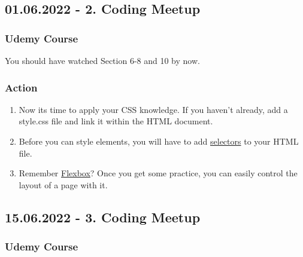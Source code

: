 \documentclass[
]{book}
\providecommand{\tightlist}{%
  \setlength{\itemsep}{0pt}\setlength{\parskip}{0pt}}
\begin{document}
\hypertarget{coding-meetup-1}{%
\subsection*{01.06.2022 - 2. Coding Meetup}\label{coding-meetup-1}}

\hypertarget{udemy-course-1}{%
\subsubsection*{Udemy Course}\label{udemy-course-1}}

You should have watched Section 6-8 and 10 by now.

\hypertarget{action-1}{%
\subsubsection*{Action}\label{action-1}}

\begin{enumerate}
\def\labelenumi{\arabic{enumi}.}
\tightlist
\item
  Now its time to apply your CSS knowledge. If you haven't already, add a style.css file and link it within the HTML document.
\item
  Before you can style elements, you will have to add \href{https://www.udemy.com/course/the-web-developer-bootcamp/learn/lecture/21917636\#overview}{selectors} to your HTML file.
\item
  Remember \href{https://www.udemy.com/course/the-web-developer-bootcamp/learn/lecture/21917734\#overview}{Flexbox}? Once you get some practice, you can easily control the layout of a page with it.
\end{enumerate}

\hypertarget{coding-meetup-2}{%
\subsection*{15.06.2022 - 3. Coding Meetup}\label{coding-meetup-2}}

\hypertarget{udemy-course-2}{%
\subsubsection*{Udemy Course}\label{udemy-course-2}}
\end{document}
